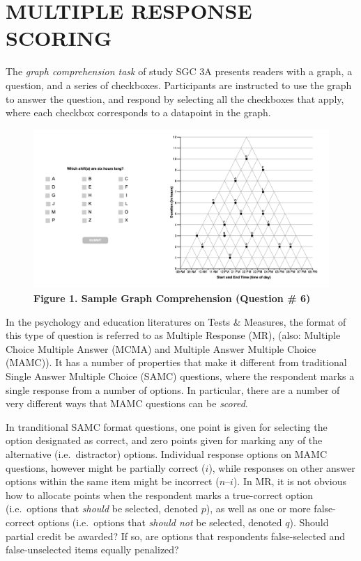 \documentclass[
  letterpaper,
  DIV=11,
  numbers=noendperiod]{scrreprt}
\begin{document}
\hypertarget{multiple-response-scoring}{%
\section{MULTIPLE RESPONSE SCORING}\label{multiple-response-scoring}}

The \emph{graph comprehension task} of study SGC 3A presents readers
with a graph, a question, and a series of checkboxes. Participants are
instructed to use the graph to answer the question, and respond by
selecting all the checkboxes that apply, where each checkbox corresponds
to a datapoint in the graph.

\begin{figure}

{\centering \includegraphics{analysis/SGC3A/static/img/sample_graphComprehensionTask.png}

}

\caption{\textbf{Figure 1. Sample Graph Comprehension (Question \# 6)}}

\end{figure}

In the psychology and education literatures on Tests \& Measures, the
format of this type of question is referred to as Multiple Response
(MR), (also: Multiple Choice Multiple Answer (MCMA) and Multiple Answer
Multiple Choice (MAMC)). It has a number of properties that make it
different from traditional Single Answer Multiple Choice (SAMC)
questions, where the respondent marks a single response from a number of
options. In particular, there are a number of very different ways that
MAMC questions can be \emph{scored}.

In tranditional SAMC format questions, one point is given for selecting
the option designated as correct, and zero points given for marking any
of the alternative (i.e.~distractor) options. Individual response
options on MAMC questions, however might be partially correct (\(i\)),
while responses on other answer options within the same item might be
incorrect (\(n – i\)). In MR, it is not obvious how to allocate points
when the respondent marks a true-correct option (i.e.~options that
\emph{should} be selected, denoted \(p\)), as well as one or more
false-correct options (i.e.~options that \emph{should not} be selected,
denoted \(q\)). Should partial credit be awarded? If so, are options
that respondents false-selected and false-unselected items equally
penalized?
\end{document}

